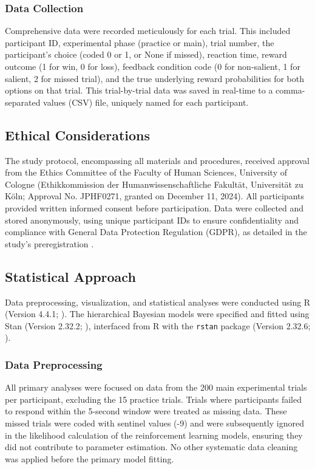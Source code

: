 \subsubsection{Data Collection}

Comprehensive data were recorded meticulously for each trial. This included participant ID, experimental phase (practice or main), trial number, the participant's choice (coded 0 or 1, or None if missed), reaction time, reward outcome (1 for win, 0 for loss), feedback condition code (0 for non-salient, 1 for salient, 2 for missed trial), and the true underlying reward probabilities for both options on that trial. This trial-by-trial data was saved in real-time to a comma-separated values (CSV) file, uniquely named for each participant.

\subsection{Ethical Considerations}

The study protocol, encompassing all materials and procedures, received approval from the Ethics Committee of the Faculty of Human Sciences, University of Cologne (Ethikkommission der Humanwissenschaftliche Fakultät, Universität zu Köln; Approval No. JPHF0271, granted on December 11, 2024). All participants provided written informed consent before participation. Data were collected and stored anonymously, using unique participant IDs to ensure confidentiality and compliance with General Data Protection Regulation (GDPR), as detailed in the study's preregistration \citep{poth2025}.

\subsection{Statistical Approach}

Data preprocessing, visualization, and statistical analyses were conducted using R (Version 4.4.1; \citealt{rcore2024}). The hierarchical Bayesian models were specified and fitted using Stan (Version 2.32.2; \citealt{stan2025}), interfaced from R with the \texttt{rstan} package (Version 2.32.6; \citealt{standev2024}).

\subsubsection{Data Preprocessing}

All primary analyses were focused on data from the 200 main experimental trials per participant, excluding the 15 practice trials. Trials where participants failed to respond within the 5-second window were treated as missing data. These missed trials were coded with sentinel values (-9) and were subsequently ignored in the likelihood calculation of the reinforcement learning models, ensuring they did not contribute to parameter estimation. No other systematic data cleaning was applied before the primary model fitting.

